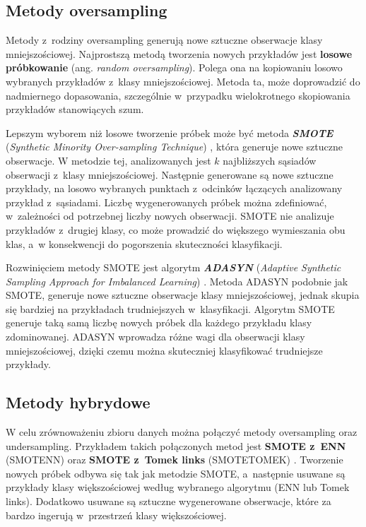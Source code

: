 \subsection{Metody oversampling}
Metody z~rodziny oversampling generują nowe sztuczne obserwacje klasy mniejszościowej. Najprostszą metodą tworzenia nowych przykładów jest \textbf{losowe próbkowanie} (ang. \textit{random oversampling}). Polega ona na kopiowaniu losowo wybranych przykładów z~klasy mniejszościowej. Metoda ta, może doprowadzić do nadmiernego dopasowania, szczególnie w~przypadku wielokrotnego skopiowania przykładów stanowiących szum. \par
Lepszym wyborem niż losowe tworzenie próbek może być metoda \textbf{\textit{SMOTE}} (\textit{Synthetic Minority Over-sampling Technique}) \cite{smotec}, która generuje nowe sztuczne obserwacje. W metodzie tej, analizowanych jest $k$ najbliższych sąsiadów obserwacji z~klasy mniejszościowej. Następnie generowane są nowe sztuczne przykłady, na losowo wybranych punktach z~odcinków łączących analizowany przykład z~sąsiadami. Liczbę wygenerowanych próbek można zdefiniować, w~zależności od potrzebnej liczby nowych obserwacji. SMOTE nie analizuje przykładów z~drugiej klasy, co może prowadzić do większego wymieszania obu klas, a~w konsekwencji do pogorszenia skuteczności klasyfikacji. \par
Rozwinięciem metody SMOTE jest algorytm \textbf{\textit{ADASYN}} (\textit{Adaptive Synthetic Sampling Approach for Imbalanced Learning}) \cite{adasync}. Metoda ADASYN podobnie jak SMOTE, generuje nowe sztuczne obserwacje klasy mniejszościowej, jednak skupia się bardziej na przykładach trudniejszych w~klasyfikacji. Algorytm SMOTE generuje taką samą liczbę nowych próbek dla każdego przykładu klasy zdominowanej. ADASYN wprowadza różne wagi dla obserwacji klasy mniejszościowej, dzięki czemu można skuteczniej klasyfikować trudniejsze przykłady.
\subsection{Metody hybrydowe}
W celu zrównoważeniu zbioru danych można połączyć metody oversampling oraz undersampling. Przykładem takich połączonych metod jest \textbf{SMOTE z~ENN} (SMOTENN) oraz \textbf{SMOTE z~Tomek links} (SMOTETOMEK) \cite{hybrid}. Tworzenie nowych próbek odbywa się tak jak metodzie SMOTE, a~następnie usuwane są przykłady klasy większościowej według wybranego algorytmu (ENN lub Tomek links). Dodatkowo usuwane są sztuczne wygenerowane obserwacje, które za bardzo ingerują w~przestrzeń klasy większościowej.
